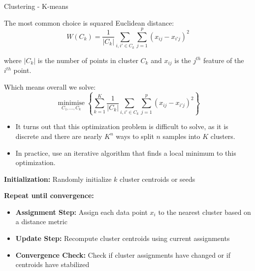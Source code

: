 \begin{frame}[allowframebreaks]{Clustering - K-means}
\begin{block}{}
    \vspace{0.5em}

    The most common choice is squared Euclidean distance:
        \begin{equation}
            W(C_k) = \frac{1}{|C_k|} \sum_{i, i' \in C_k} \sum_{j=1}^{p} (x_{ij} - x_{i'j})^2
        \end{equation}
    
        where $|C_k|$ is the number of points in cluster $C_k$ and $x_{ij}$ is the $j^{th}$ feature of the $i^{th}$ point.
    
    \vspace{0.5em}
    
    Which means overall we solve:
        \begin{equation}
            \operatorname*{minimise}_{C_1, \ldots, C_k} \left\{ \sum_{k=1}^{K} \frac{1}{|C_k|} \sum_{i, i' \in C_k} \sum_{j=1}^{p} (x_{ij} - x_{i'j})^2 \right\}
        \end{equation}
\end{block}

\framebreak

\begin{itemize}
    \setlength{\itemsep}{0.5em}
    \item It turns out that this optimization problem is difficult to solve, as it is  discrete and there are nearly $K^n$	ways to split $n$ samples into $K$ clusters.
    \item In practice, use an iterative algorithm that finds a local minimum to this  optimization.
\end{itemize}

\framebreak

\begin{algorithm}[H]
\caption{K-means Clustering Algorithm}

\vspace{0.8em}

\textbf{Initialization:} Randomly initialize $k$ cluster centroids or seeds\;

\vspace{0.8em}

\textbf{Repeat until convergence:}
\begin{itemize}
    \item \textbf{Assignment Step:} Assign each data point $x_i$ to the nearest cluster based on a distance metric\;
    \vspace{0.5em}
    \item \textbf{Update Step:} Recompute cluster centroids using current assignments\;
    \vspace{0.5em}
    \item \textbf{Convergence Check:} Check if cluster assignments have changed or if centroids have stabilized\;
\end{itemize}


\end{algorithm}
\end{frame}
